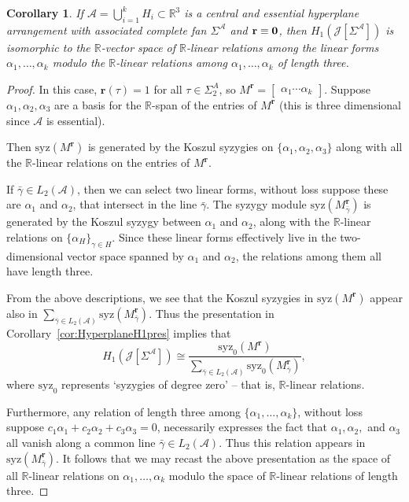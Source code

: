 \documentclass[11pt, reqno]{amsart}
\newcommand{\RR}{\mathbb{R}}
\newcommand{\br}{\mathbf{r}}
\newcommand{\calJ}{\mathcal{J}}
\newcommand{\A}{\mathcal{A}}
\newcommand{\syz}{\mathrm{syz}}
\newtheorem{corollary}[theorem]{Corollary}
\theoremstyle{definition}
\theoremstyle{remark}
\numberwithin{equation}{section}
\begin{document}
\begin{corollary}
If $\A=\bigcup_{i=1}^k H_i\subset\RR^3$ is a central and essential hyperplane arrangement with associated complete fan $\Sigma^\A$ and $\br\equiv \bf{0}$, then $H_1(\calJ[\Sigma^\A])$ is isomorphic to the $\RR$-vector space of $\RR$-linear relations among the linear forms $\alpha_1,\ldots,\alpha_k$ modulo the $\RR$-linear relations among $\alpha_1,\ldots,\alpha_k$ of length three.
\end{corollary}
\begin{proof}
In this case, $\br(\tau)=1$ for all $\tau\in\Sigma^A_2$, so $M^{\br}=\begin{bmatrix} \alpha_1 \cdots \alpha_k\end{bmatrix}$.  Suppose $\alpha_1,\alpha_2, \alpha_3$ are a basis for the $\RR$-span of the entries of $M^{\br}$ (this is three dimensional since $\A$ is essential).

Then $\syz(M^{\br})$ is generated by the Koszul syzygies on $\{\alpha_1,\alpha_2,\alpha_3\}$ along with all the $\RR$-linear relations on the entries of $M^{\br}$.  

If $\bar{\gamma}\in L_2(\A)$, then we can select two linear forms, without loss suppose these are $\alpha_1$ and $\alpha_2$, that intersect in the line $\bar{\gamma}$.  The syzygy module $\syz(M^{\br}_{\bar{\gamma}})$ is generated by the Koszul syzygy between $\alpha_1$ and $\alpha_2$, along with the $\RR$-linear relations on $\{\alpha_H\}_{\gamma\in H}$.  Since these linear forms effectively live in the two-dimensional vector space spanned by $\alpha_1$ and $\alpha_2$, the relations among them all have length three.

From the above descriptions, we see that the Koszul syzygies in $\syz(M^{\br})$ appear also in $\sum\limits_{\bar{\gamma}\in L_2(\A)}\syz(M^{\br}_{\bar{\gamma}})$.  Thus the presentation in Corollary~\ref{cor:HyperplaneH1pres} implies that 
\[
H_1(\calJ[\Sigma^\A])\cong \dfrac{\syz_0 (M^\br)}{\sum_{\bar{\gamma}\in L_2(\A)} \syz_0(M^{\br}_{\bar{\gamma}})},
\]
where $\syz_0$ represents `syzygies of degree zero' -- that is, $\RR$-linear relations.

Furthermore, any relation of length three among $\{\alpha_1,\ldots,\alpha_k\}$, without loss suppose $c_1\alpha_1+c_2\alpha_2+c_3\alpha_3=0$, necessarily expresses the fact that $\alpha_1,\alpha_2,$ and $\alpha_3$ all vanish along a common line $\bar{\gamma}\in L_2(\A)$.  Thus this relation appears in $\syz(M^{\br}_{\bar{\gamma}})$.  It follows that we may recast the above presentation as the space of all $\RR$-linear relations on $\alpha_1,\ldots,\alpha_k$ modulo the space of $\RR$-linear relations of length three.
\end{proof}
\end{document}
